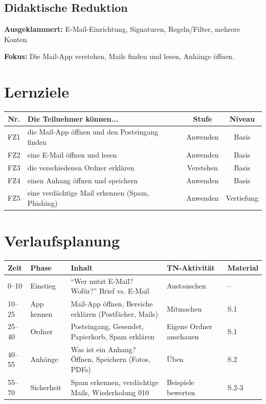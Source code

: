 \documentclass[11pt,a4paper]{article}
\begin{document}
\subsection{Didaktische Reduktion}
\textbf{Ausgeklammert:} E-Mail-Einrichtung, Signaturen, Regeln/Filter, mehrere Konten.

\textbf{Fokus:} Die Mail-App verstehen, Mails finden und lesen, Anhänge öffnen.

\section{Lernziele}

\begin{tabular}{|c|p{7cm}|c|c|}
\hline
\textbf{Nr.} & \textbf{Die Teilnehmer können...} & \textbf{Stufe} & \textbf{Niveau} \\
\hline
FZ1 & die Mail-App öffnen und den Posteingang finden & Anwenden & Basis \\
FZ2 & eine E-Mail öffnen und lesen & Anwenden & Basis \\
FZ3 & die verschiedenen Ordner erklären & Verstehen & Basis \\
FZ4 & einen Anhang öffnen und speichern & Anwenden & Basis \\
FZ5 & eine verdächtige Mail erkennen (Spam, Phishing) & Anwenden & Vertiefung \\
\hline
\end{tabular}

\section{Verlaufsplanung}

\begin{longtable}{|p{1cm}|p{2cm}|p{5cm}|p{3cm}|p{2cm}|}
\hline
\textbf{Zeit} & \textbf{Phase} & \textbf{Inhalt} & \textbf{TN-Aktivität} & \textbf{Material} \\
\hline
0--10 & Einstieg & ``Wer nutzt E-Mail? Wofür?'' Brief vs. E-Mail & Austauschen & -- \\
\hline
10--25 & App kennen & Mail-App öffnen, Bereiche erklären (Postfächer, Mails) & Mitmachen & S.1 \\
\hline
25--40 & Ordner & Posteingang, Gesendet, Papierkorb, Spam erklären & Eigene Ordner anschauen & S.1 \\
\hline
40--55 & Anhänge & Was ist ein Anhang? Öffnen, Speichern (Fotos, PDFs) & Üben & S.2 \\
\hline
55--70 & Sicherheit & Spam erkennen, verdächtige Mails, Wiederholung 010 & Beispiele bewerten & S.2-3 \\
\hline
\end{longtable}
\end{document}
